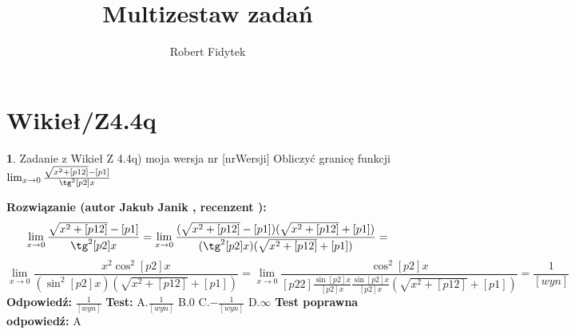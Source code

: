 \documentclass[12pt, a4paper]{article}
\title{Multizestaw zadań}
\author{Robert Fidytek}
\date{}
\theoremstyle{definition} %
\newtheorem{zad}{}
\newcommand{\kategoria}[1]{\section{#1}} %
\newcommand{\zadStart}[1]{\begin{zad}#1\newline} %
\newcommand{\zadStop}{\end{zad}}   %
\newcommand{\rozwStart}[2]{\noindent \textbf{Rozwiązanie (autor #1 , recenzent #2): }\newline} %
\newcommand{\rozwStop}{\newline}                                            %
\newcommand{\odpStart}{\noindent \textbf{Odpowiedź:}\newline}    %
\newcommand{\odpStop}{\newline}                                             %
\newcommand{\testStart}{\noindent \textbf{Test:}\newline} %
\newcommand{\testStop}{\newline} %
\newcommand{\kluczStart}{\noindent \textbf{Test poprawna odpowiedź:}\newline} %
\newcommand{\kluczStop}{\newline} %
\begin{document}
\maketitle


\kategoria{Wikieł/Z4.4q}
\zadStart{Zadanie z Wikieł Z 4.4q) moja wersja nr [nrWersji]}
Obliczyć granicę funkcji $\lim_{x \to 0} \frac{\sqrt{x^2+[p12]}-[p1]}{\tg^2{[p2]x}}$
\zadStop
\rozwStart{Jakub Janik}{}
$$\lim_{x \to 0} \frac{\sqrt{x^2+[p12]}-[p1]}{\tg^2{[p2]x}}=\lim_{x \to 0} \frac{(\sqrt{x^2+[p12]}-[p1])(\sqrt{x^2+[p12]}+[p1])}{(\tg^2{[p2]x})(\sqrt{x^2+[p12]}+[p1])}=$$
$$\lim_{x \to 0} \frac{x^2\cos^2{[p2]x}}{(\sin^2{[p2]x})(\sqrt{x^2+[p12]}+[p1])}=\lim_{x \to 0} \frac{\cos^2{[p2]x}}{[p22]\frac{\sin{[p2]x}}{[p2]x}\frac{\sin{[p2]x}}{[p2]x}(\sqrt{x^2+[p12]}+[p1])}=\frac{1}{[wyn]}$$
\rozwStop
\odpStart
$\frac{1}{[wyn]}$
\odpStop
\testStart
A.$\frac{1}{[wyn]}$
B.$0$
C.$-\frac{1}{[wyn]}$
D.$\infty$
\testStop
\kluczStart
A
\kluczStop
\end{document}
